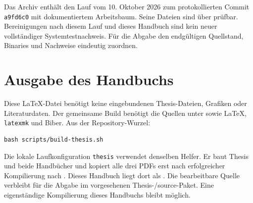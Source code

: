 \documentclass[12pt,a4paper]{article}
\begin{document}
Das Archiv  enthält den Lauf vom 10. Oktober 2026 zum
protokollierten Commit \texttt{a9fd6c0} mit dokumentiertem Arbeitsbaum.
Seine Dateien sind über  prüfbar.
Bereinigungen nach diesem Lauf und dieses Handbuch sind kein neuer vollständiger
Systemtestnachweis. Für die Abgabe den endgültigen Quellstand, Binaries und
Nachweise eindeutig zuordnen.

\section{Ausgabe des Handbuchs}
Diese LaTeX-Datei benötigt keine eingebundenen Thesis-Dateien, Grafiken oder
Literaturdaten. Der gemeinsame Build benötigt die Quellen unter 
sowie LaTeX, \texttt{latexmk} und Biber. Aus der Repository-Wurzel:
\begin{lstlisting}
bash scripts/build-thesis.sh
\end{lstlisting}
Die lokale Laufkonfiguration \texttt{thesis} verwendet denselben Helfer. Er baut
Thesis und beide Handbücher und kopiert alle drei PDFs erst nach erfolgreicher
Kompilierung nach . Dieses Handbuch liegt dort als
. Die bearbeitbare Quelle
verbleibt für die Abgabe im vorgesehenen Thesis-/source-Paket.
Eine eigenständige Kompilierung dieses Handbuchs bleibt möglich.
\end{document}
